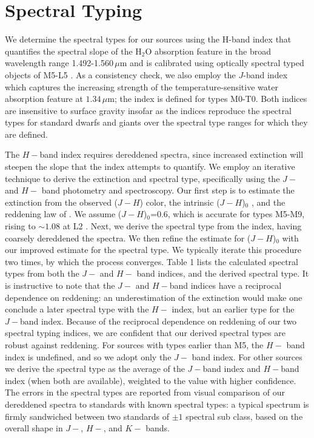 \section{Spectral Typing}
We determine the spectral types for our sources using the H-band index that quantifies the spectral slope of the H$_{2}$O absorption feature in the broad wavelength range 1.492-1.560$\, \mu$m and is calibrated using optically spectral typed objects of M5-L5 \citep{allers07}.  As a consistency check, we also employ the \citet{slesnick04} $J$-band index which captures the increasing strength of the temperature-sensitive water absorption feature at $1.34 \,\mu$m; the index is defined for types M0-T0.  Both indices are insensitive to surface gravity \citep{slesnick04,allers07} insofar as the indices reproduce the spectral types for standard dwarfs and giants over the spectral type ranges for which they are defined.

The \citet{allers07} $H-$band index requires dereddened spectra, since increased extinction will steepen the slope that the index attempts to quantify.  We employ an iterative technique to derive the extinction and spectral type, specifically using the $J-$ and $H-$ band photometry and spectroscopy.  Our first step is to estimate the extinction from the observed ($J-H$) color, the intrinsic ($J-H$)$_{0}$ \citep{patten06}, and the reddening law of \citet{fitzpatrick1999}.  We assume ($J-H$)$_{0}$=0.6, which is accurate for types M5-M9, rising to $\sim1.08$ at L2 \citep{patten06}.  Next, we derive the spectral type from the \citet{allers07} index, having coarsely dereddened the spectra.  We then refine the estimate for ($J-H$)$_{0}$ with our improved estimate for the spectral type.  We typically iterate this procedure two times, by which the process converges.  Table 1 lists the calculated spectral types from both the $J-$ and $H-$ band indices, and the derived spectral type.  It is instructive to note that the $J-$ and $H-$band indices have a reciprocal dependence on reddening: an underestimation of the extinction would make one conclude a later spectral type with the $H-$ index, but an earlier type for the $J-$band index.  Because of the reciprocal dependence on reddening of our two spectral typing indices, we are confident that our derived spectral types are robust against reddening.  For sources with types earlier than M5, the $H-$ band index is undefined, and so we adopt only the $J-$ band index.  For other sources we derive the spectral type as the average of the $J-$band index and $H-$band index (when both are available), weighted to the value with higher confidence.  The errors in the spectral types are reported from visual comparison of our dereddened spectra to standards with known spectral types: a typical spectrum is firmly sandwiched between two standards of $\pm1$ spectral sub class, based on the overall shape in $J-$, $H-$, and $K-$ bands.

